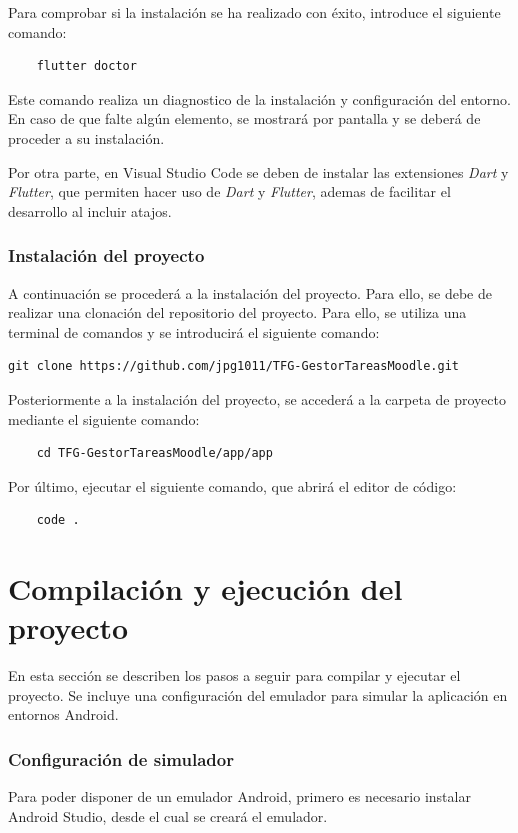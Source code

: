 Para comprobar si la instalación se ha realizado con éxito, introduce el siguiente comando:
\begin{verbatim}
    flutter doctor
\end{verbatim}
Este comando realiza un diagnostico de la instalación y configuración del entorno. En caso de que falte algún elemento, se mostrará por pantalla y se deberá de proceder a su instalación.

Por otra parte, en Visual Studio Code se deben de instalar las extensiones \textit{Dart} y \textit{Flutter}, que permiten hacer uso de \textit{Dart} y \textit{Flutter}, ademas de facilitar el desarrollo al incluir atajos.

\subsubsection{Instalación del proyecto}

A continuación se procederá a la instalación del proyecto. Para ello, se debe de realizar una clonación del repositorio del proyecto. Para ello, se utiliza una terminal de comandos y se introducirá el siguiente comando:
\begin{verbatim}
git clone https://github.com/jpg1011/TFG-GestorTareasMoodle.git
\end{verbatim}

Posteriormente a la instalación del proyecto, se accederá a la carpeta de proyecto mediante el siguiente comando:
\begin{verbatim}
    cd TFG-GestorTareasMoodle/app/app
\end{verbatim}

Por último, ejecutar el siguiente comando, que abrirá el editor de código:
\begin{verbatim}
    code .
\end{verbatim}

\section{Compilación y ejecución del proyecto}
En esta sección se describen los pasos a seguir para compilar y ejecutar el proyecto. Se incluye una configuración del emulador para simular la aplicación en entornos Android.

\subsubsection{Configuración de simulador}
Para poder disponer de un emulador Android, primero es necesario instalar Android Studio, desde el cual se creará el emulador.

